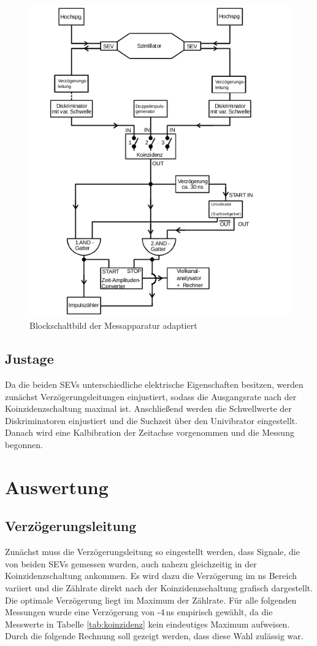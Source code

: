 \begin{figure}[H]
	\centering
	\includegraphics[width=0.7\linewidth,height=0.8\textheight,keepaspectratio]{Bilder/blockAdaptiert.png}
	\caption{Blockschaltbild der Messapparatur adaptiert \cite{Anl}}
	\label{FIG:Aufbau}
\end{figure}

\subsection{Justage}
Da die beiden SEVs unterschiedliche elektrische Eigenschaften besitzen, werden zunächst Verzögerungsleitungen einjustiert, sodass die Ausgangsrate nach der Koinzidenzschaltung maximal ist. Anschließend werden die Schwellwerte der Diskriminatoren einjustiert und die Suchzeit über den Univibrator eingestellt. Danach wird eine Kalbibration der Zeitachse vorgenommen und die Messung begonnen.

\section{Auswertung}

\subsection{Verzögerungsleitung}
Zunächst muss die Verzögerungsleitung so eingestellt werden, dass Signale, die von beiden SEVs gemessen wurden, auch nahezu gleichzeitig in der Koinzidenzschaltung ankommen. Es wird dazu die Verzögerung im ns Bereich variiert und die Zählrate direkt nach der Koinzidenzschaltung grafisch dargestellt. Die optimale Verzögerung liegt im Maximum der Zählrate.
Für alle folgenden Messungen wurde eine Verzögerung von -4\,\si{ns} empirisch gewählt, da die Messwerte in Tabelle \ref{tab:koinzidenz} kein eindeutiges Maximum aufweisen. Durch die folgende Rechnung soll gezeigt werden, dass diese Wahl zulässig war. 

